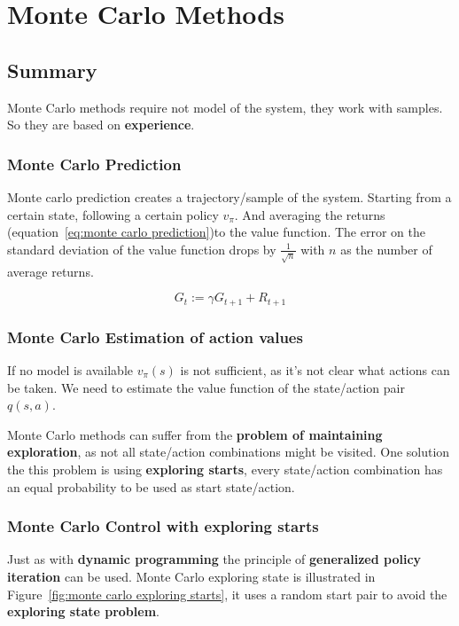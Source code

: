 \chapter{Monte Carlo Methods}

\section{Summary}

Monte Carlo methods require not model of the system, they work with samples. So they are based on \textbf{experience}.

\subsection{Monte Carlo Prediction}
Monte carlo prediction creates a trajectory/sample of the system. Starting from a certain state, following a certain policy $v_{\pi}$. And averaging the returns (equation~\ref{eq:monte carlo prediction})to the value function. The error on the standard deviation of the value function drops by $\frac{1}{\sqrt{n}}$ with $n$ as the number of average returns.

\begin{equation}
    G_t := \gamma G_{t+1} + R_{t+1}
    \label{eq:monte carlo prediction}
\end{equation}

\subsection{Monte Carlo Estimation of action values}
If no model is available $v_{\pi}(s)$ is not sufficient, as it's not clear what actions can be taken. We need to estimate the value function of the state/action pair $q(s,a)$.

Monte Carlo methods can suffer from the \textbf{problem of maintaining exploration}, as not all state/action combinations might be visited. One solution the this problem is using \textbf{exploring starts}, every state/action combination has an equal probability to be used as start state/action.

\subsection{Monte Carlo Control with exploring starts}

Just as with \textbf{dynamic programming} the principle of \textbf{generalized policy iteration} can be used. Monte Carlo exploring state is illustrated in Figure~\ref{fig:monte carlo exploring starts}, it uses a random start pair to avoid the \textbf{exploring state problem}.

